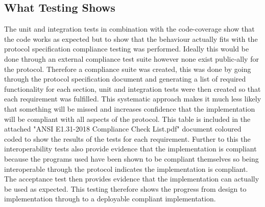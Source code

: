\documentclass[11pt,a4paper]{article}
\begin{document}
\subsection{What Testing Shows}
The unit and integration tests in combination with the code-coverage show that the code works as expected but to show that the behaviour actually fits with the protocol specification compliance testing was performed. Ideally this would be done through an external compliance test suite however none exist public-ally for the protocol. Therefore a compliance suite was created, this was done by going through the protocol specification document \cite{ANSI_E1.31} and generating a list of required functionality for each section, unit and integration tests were then created so that each requirement was fulfilled. This systematic approach makes it much less likely that something will be missed and increases confidence that the implementation will be compliant with all aspects of the protocol. This table is included in the attached "ANSI E1.31-2018 Compliance Check List.pdf" document coloured coded to show the results of the tests for each requirement. Further to this the interoperability tests also provide evidence that the implementation is compliant because the programs used have been shown to be compliant themselves so being interoperable through the protocol indicates the implementation is compliant. The acceptance test then provides evidence that the implementation can actually be used as expected. This testing therefore shows the progress from design to implementation through to a deployable compliant implementation.
\end{document}
